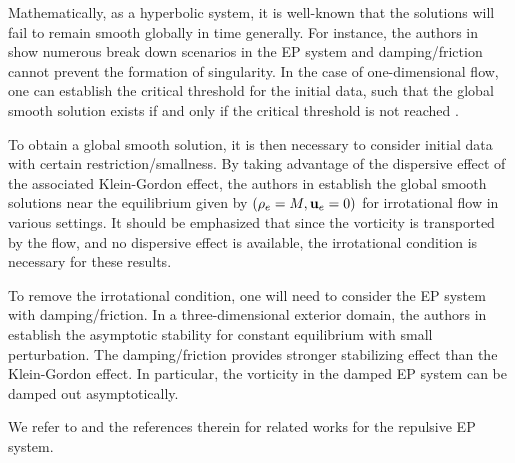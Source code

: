 \documentclass[11pt]{article}
\theoremstyle{plain}
\theoremstyle{definition}
\theoremstyle{remark}
\renewcommand{\vec}[1]{{\bf #1}}
\numberwithin{equation}{section}
\begin{document}
    Mathematically, as a hyperbolic system, it is well-known that the solutions will fail to remain smooth globally in time generally. For instance, the authors in \cite{baeFormationSingularitiesPlasma2024,baeStructureSingularitiesEulerPoisson2024,wangFormationSingularitiesEuler2014,perthameNonexistenceGlobalSolutions1990,rozanovaRepulsiveEulerPoisson2025,chaeFiniteTimeBlowup2008,wangFormationSingularitiesCompressible1998,yuenBlowupEulerEuler2011} show numerous break down scenarios in the EP system and damping/friction cannot prevent the formation of singularity. In the case of one-dimensional flow, one can establish the critical threshold for the initial data, such that the global smooth solution exists if and only if the critical threshold is not reached \cite{engelbergCriticalThresholdsEulerPoisson2001,tadmorGlobalRegularitySubcritical2008,bhatnagarCriticalThresholdsEulerPoissonalignment2023,bhatnagarCompleteCharacterizationSharp2023,luanEulerPoissonEquationsVariable2025}.

    To obtain a global smooth solution, it is then necessary to consider initial data with certain restriction/smallness. By taking advantage of the dispersive effect of the associated Klein-Gordon effect, the authors in \cite{guoSmoothIrrotationalFlows1998a,guoGlobalSmoothIon2011,germainNonneutralGlobalSolutions2013,guoAbsenceShocksOne2017,ionescuEulerPoissonSystem2013,guoGlobalSolutionsCertain2014,jangTwodimensionalEulerPoissonSystem2012} establish the global smooth solutions near the equilibrium given by $ (\rho_e = M, \vec u_e = 0 ) $ for irrotational flow in various settings. It should be emphasized that since the vorticity is transported by the flow, and no dispersive effect is available, the irrotational condition is necessary for these results. 

    To remove the irrotational condition, one will need to consider the EP system with damping/friction. In a three-dimensional exterior domain, the authors in \cite{liuGlobalSolutionsCompressible2020} establish the asymptotic stability for constant equilibrium with small perturbation.  The damping/friction provides stronger stabilizing effect than the Klein-Gordon effect. In particular, the vorticity in the damped EP system can be damped out asymptotically. 

    We refer to \cite{cordierQuasineutralLimitEulerpoisson2000,liTwofluidEulerPoisson2013,roussetTransverseAsymptoticStability2025,carrilloExistenceRadialGlobal2023,choiLargetimeBehaviorPressureless2025} and the references therein for related works for the repulsive EP system. 
\end{document}
